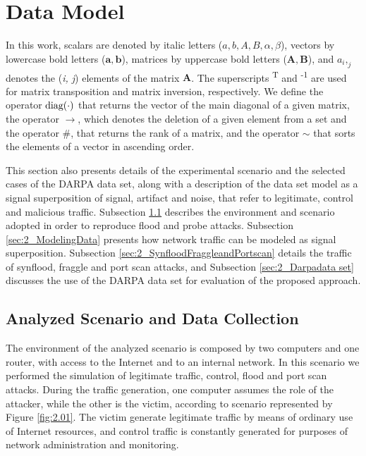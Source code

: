 \section{Data Model}
\label{sec:2_datamodel}

In this work, scalars are denoted by italic letters ($a, b, A, B, \alpha, \beta$), vectors by lowercase bold letters ($\pmb{a}, \pmb{b}$), matrices by uppercase bold letters ($\pmb{A}, \pmb{B}$), and $a_i,_j$ denotes the (\emph{i, j}) elements of the matrix $\pmb{A}$. The superscripts \textsuperscript{T} and \textsuperscript{-1} are used for matrix transposition and matrix inversion, respectively. We define the operator $\rm diag(\cdot)$ that returns the vector of the main diagonal of a given matrix, the operator $\rightarrow$, which denotes the deletion of a given element from a set and the operator $\#$, that returns the rank of a matrix, and the operator $\sim$ that sorts the elements of a vector in ascending order.

This section also presents details of the experimental scenario and the selected cases of the DARPA data set, along with a description of the data set model as a signal superposition of signal, artifact and noise, that refer to legitimate, control and malicious traffic. Subsection \ref{sec:2_DataCollection} describes the environment and scenario adopted in order to reproduce flood and probe attacks. Subsection \ref{sec:2_ModelingData} presents how network traffic can be modeled as signal superposition. Subsection \ref{sec:2_SynfloodFraggleandPortscan} details the traffic of synflood, fraggle and port scan attacks, and Subsection \ref{sec:2_Darpadata set} discusses the use of the DARPA data set for evaluation of the proposed approach.

\subsection{Analyzed Scenario and Data Collection}
\label{sec:2_DataCollection}

The environment of the analyzed scenario is composed by two computers and one router, with access to the Internet and to an internal network. In this scenario we performed the simulation of legitimate traffic, control, flood and port scan attacks. During the traffic generation, one computer assumes the role of the attacker, while the other is the victim, according to scenario represented by Figure \ref{fig:2.01}. The victim generate legitimate traffic by means of ordinary use of Internet resources, and control traffic is constantly generated for purposes of network administration and monitoring.

